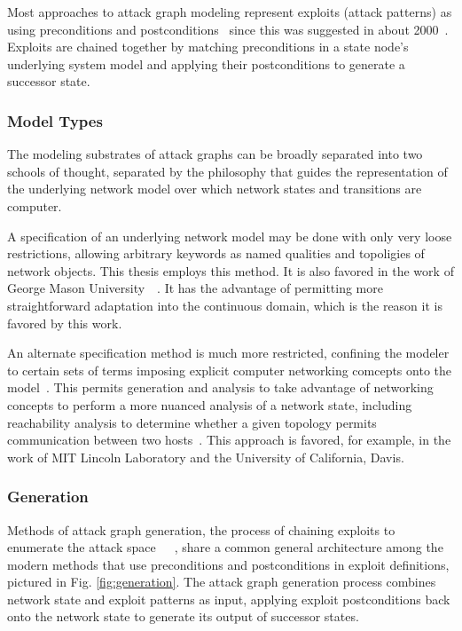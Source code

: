 Most approaches to attack graph modeling represent exploits (attack patterns) as using
preconditions and postconditions~\cite{lippmann2005annotated} since this was suggested in about 2000~\cite{templeton2001requires}. Exploits are chained together by matching preconditions in a state node's
underlying system model and applying their postconditions to generate a successor state.
\subsubsection{Model Types}
The modeling substrates of attack graphs can be broadly separated into two schools of
thought, separated by the philosophy that guides the representation of the underlying
network model over which network states and transitions are computer.

A specification of an underlying network model may be done with only very loose
restrictions, allowing arbitrary keywords as named qualities and topoligies of network objects.
This thesis employs this method. It is also favored in the work of George Mason 
University~\cite{ammann2002scalable}~\cite{wang2006minimum}. It has the advantage of
permitting more straightforward adaptation into the continuous domain, which is the reason
it is favored by this work. 

An alternate specification method is much more restricted, confining the modeler to
certain sets of terms imposing explicit computer networking comcepts onto the model~\cite{templeton2001requires}.
This permits generation and analysis to take advantage of networking concepts to perform a
more nuanced analysis of a network state, including reachability analysis to determine whether a
given topology permits communication between two hosts~\cite{ingols2009modeling}. This approach
is favored, for example, in the work of MIT Lincoln Laboratory and the University of California, Davis.
\subsubsection{Generation}
Methods of attack graph generation, the process of chaining exploits to enumerate the
attack space~\cite{campbell2002modeling}~\cite{phillips1998graph}~\cite{sheyner2002automated},
share a common general architecture among the modern
methods that use preconditions and postconditions in exploit definitions,
pictured in Fig. \ref{fig:generation}. The attack graph generation
process combines network state and exploit patterns as input, applying exploit postconditions
back onto the network state to generate its output of successor states.

